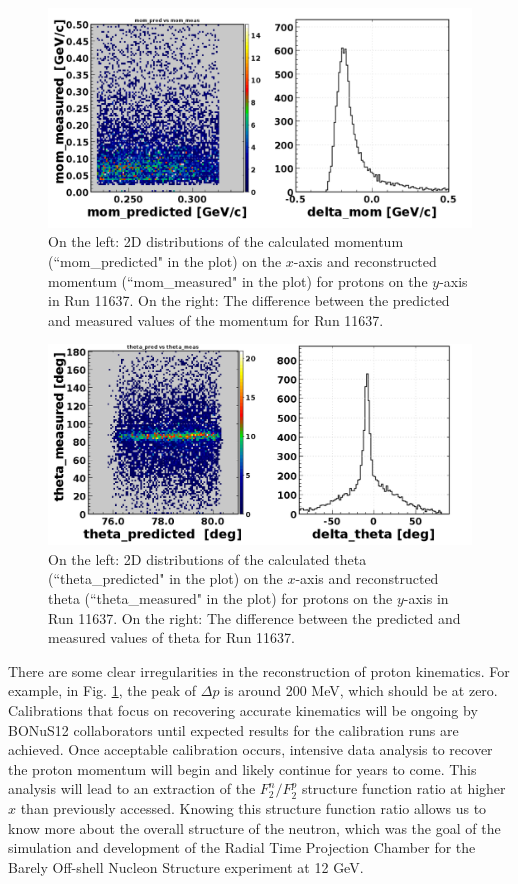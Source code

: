 \begin{figure}[h!]
	\centering
	\includegraphics[width=0.9\linewidth]{figures/rgf/11637/momentum.png}
	\caption{On the left: 2D distributions of the calculated momentum (``mom\_predicted" in the plot) on the $x$-axis and reconstructed momentum (``mom\_measured" in the plot) for protons on the $y$-axis in Run 11637. On the right: The difference between the predicted and measured values of the momentum for Run 11637.}
	\label{fig:rgf_pmom}
\end{figure}
\begin{figure}[h!]
	\centering
	\includegraphics[width=0.9\linewidth]{figures/rgf/11637/ptheta.png}
	\caption{On the left: 2D distributions of the calculated theta (``theta\_predicted" in the plot) on the $x$-axis and reconstructed theta (``theta\_measured" in the plot) for protons on the $y$-axis in Run 11637. On the right: The difference between the predicted and measured values of theta for Run 11637.}
	\label{fig:rgf_ptheta}
\end{figure}

There are some clear irregularities in the reconstruction of proton kinematics. For example, in Fig. \ref{fig:rgf_pmom}, the peak of $\Delta p$ is around 200 MeV, which should be at zero. Calibrations that focus on recovering accurate kinematics will be ongoing by BONuS12 collaborators until expected results for the calibration runs are achieved. Once acceptable calibration occurs, intensive data analysis to recover the proton momentum will begin and likely continue for years to come. This analysis will lead to an extraction of the $F_2^n/F_2^p$ structure function ratio at higher $x$ than previously accessed. Knowing this structure function ratio allows us to know more about the overall structure of the neutron, which was the goal of the simulation and development of the Radial Time Projection Chamber for the Barely Off-shell Nucleon Structure experiment at 12 GeV.

